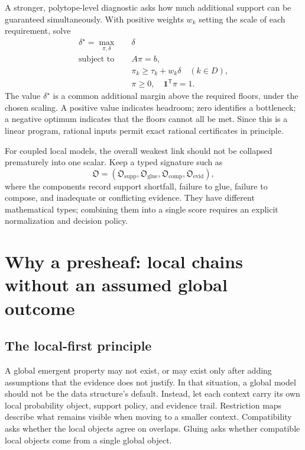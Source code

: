 \documentclass[11pt]{article}
\newcommand{\Ob}{\mathfrak{O}}
\begin{document}
A stronger, polytope-level diagnostic asks how much additional support can be guaranteed simultaneously. With positive weights $w_k$ setting the scale of each requirement, solve
\begin{equation}\label{eq:robust}
\begin{aligned}
  \delta^\star=\max_{\pi,\delta}\quad &\delta\\
  \text{subject to}\quad&A\pi=b,\\
  &\pi_k\geq\tau_k+w_k\delta\quad(k\in D),\\
  &\pi\geq0,\quad \mathbf{1}^{\mathsf T}\pi=1.
\end{aligned}
\end{equation}
The value $\delta^\star$ is a common additional margin above the required floors, under the chosen scaling. A positive value indicates headroom; zero identifies a bottleneck; a negative optimum indicates that the floors cannot all be met. Since this is a linear program, rational inputs permit exact rational certificates in principle.

For coupled local models, the overall weakest link should not be collapsed prematurely into one scalar. Keep a typed signature such as
\[
  \Ob=(\Ob_{\mathrm{supp}},\Ob_{\mathrm{glue}},\Ob_{\mathrm{comp}},\Ob_{\mathrm{evid}}),
\]
where the components record support shortfall, failure to glue, failure to compose, and inadequate or conflicting evidence. They have different mathematical types; combining them into a single score requires an explicit normalization and decision policy.

\section{Why a presheaf: local chains without an assumed global outcome}

\subsection{The local-first principle}

A global emergent property may not exist, or may exist only after adding assumptions that the evidence does not justify. In that situation, a global model should not be the data structure's default. Instead, let each context carry its own local probability object, support policy, and evidence trail. Restriction maps describe what remains visible when moving to a smaller context. Compatibility asks whether the local objects agree on overlaps. Gluing asks whether compatible local objects come from a single global object.
\end{document}
